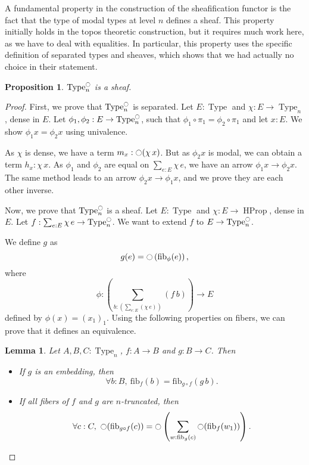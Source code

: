 \documentclass[conference]{IEEEtran}
\newtheorem{prop}[thm]{Proposition}
\newtheorem{lem}[thm]{Lemma}
\DeclareMathOperator{\Type}{Type}
\DeclareMathOperator{\HProp}{HProp}
\newcommand{\modal}{\ensuremath{\ocircle}}
\newcommand \fib[2] {\mathrm{fib}_{#1}(#2)}
\begin{document}
A fundamental property in the construction of the sheafification
functor is the fact that the type of modal types at level $n$ defines
a sheaf.
%
This property initially holds in the topos theoretic construction, but
it requires much work here, as we have to deal with equalities. In
particular, this property uses the specific definition
of separated types and sheaves, which shows that we had actually no
choice in their statement. 


\begin{prop}\label{prop:sheaf-is-sheaf}
  $\Type_n^\modal$ is a sheaf.
\end{prop}
\begin{proof}
  First, we prove that $\Type_n^\modal$ is separated. Let $E:\Type$
  and $\chi:E \to \Type_n$, dense in $E$. Let $\phi_1,\phi_2:E \to
  \Type_n^\modal$, such that $\phi_1 \circ \pi_1 = \phi_2 \circ
  \pi_1$ and let $x:E$. We show $\phi_1 x = \phi_2 x$ using
  univalence.

  As $\chi$ is dense, we have a term $m_x : \modal(\chi\, x)$.
  But as $\phi_2 x$ is modal, we can obtain a term $h_x : \chi\,
  x$. 
  As $\phi_1$ and $\phi_2$ are equal on $\sum_{e:E}\chi\, e$, we
  have an arrow $\phi_1 x \to \phi_2 x$.
  The same method leads to an arrow $\phi_2 x \to \phi_1 x$, and we
  prove they are each other inverse.

  Now, we prove that $\Type_n^\modal$ is a sheaf. Let $E:\Type$ and
  $\chi:E \to \HProp$, dense in $E$. Let $f:\sum_{e:E} \chi\, e \to
  \Type_n^\modal$. We want to extend $f$ to $E \to \Type_n^\modal$.

  We define $g$ as 
  $$g(e) = \modal \left( \fib \phi e \right), $$
  where
  $$\phi : \left(\sum_{b:\left(\sum_{e:E} (\chi\, e)\right)} (f\,
    b)\right) \to E$$
  defined by $\phi(x) = (x_1)_1$.
  Using the following properties on fibers, we can prove that it
  defines an equivalence.
  \begin{lem}
    Let $A,B,C:\Type_n$, $f:A\to B$ and $g:B\to C$.
    Then
    \begin{itemize}
    \item If $g$ is an embedding, then 
      $$\forall b:B,~\fib f b = \fib {g\circ f} {g\, b}.$$
    \item If all fibers of $f$ and $g$ are $n$-truncated, then
      $$\forall c:C,~\modal(\fib {g \circ f} c) =
      \modal \left(  
        \sum_{w:\fib g c} \modal (\fib f {w_1})
      \right).$$
    \end{itemize}
  \end{lem}

\end{proof}
\end{document}
